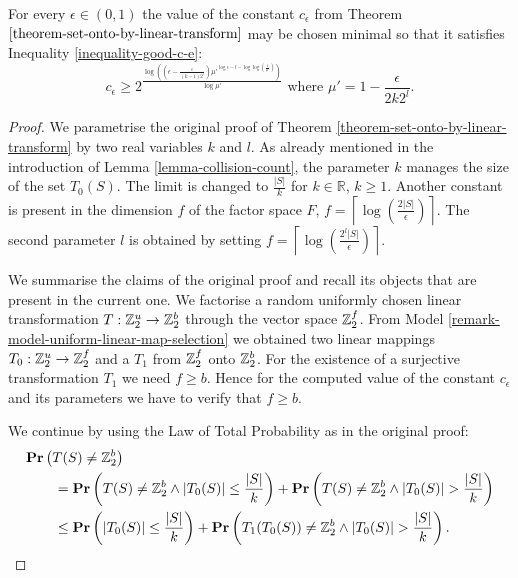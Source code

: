 \begin{statement}
\label{statement-good-c-e}
For every $\epsilon \in (0, 1)$ the value of the constant $c_\epsilon$ from Theorem $\ref{theorem-set-onto-by-linear-transform}$ may be chosen minimal so that it satisfies Inequality \ref{inequality-good-c-e}:
\begin{equation}
\label{inequality-good-c-e}
c_\epsilon \geq 2 ^ {\frac{\log \left( \left( \epsilon - \frac{\epsilon}{(k - 1) 2 ^ l}\right) {\mu'}^{\log \epsilon - l - \log \log \left(\frac{1}{\mu'}\right)}\right)}{\log \mu'}} \text{ where $\mu' = 1 - \frac{\epsilon}{2k2 ^ l}$.}
\end{equation}
\end{statement}
\begin{proof}
We parametrise the original proof of Theorem \ref{theorem-set-onto-by-linear-transform} by two real variables $k$ and $l$. As already mentioned in the introduction of Lemma \ref{lemma-collision-count}, the parameter $k$ manages the size of the set $T_0(S)$. The limit is changed to $\frac{|S|}{k}$ for $k \in \mathbb{R}$, $k \geq 1$. Another constant is present in the dimension $f$ of the factor space $F$, $f = \left\lceil \log \left(\frac{2|S|}{\epsilon}\right) \right\rceil$. The second parameter $l$ is obtained by setting $f = \left\lceil \log \left( \frac{2 ^ l |S|}{\epsilon} \right) \right\rceil$.

We summarise the claims of the original proof and recall its objects that are present in the current one. We factorise a random uniformly chosen linear transformation $T: \mathbb{Z}_{2}^{u} \rightarrow \mathbb{Z}_{2}^{b}$ through the vector space $\mathbb{Z}_{2}^{f}$. From Model \ref{remark-model-uniform-linear-map-selection} we obtained two linear mappings $T_0: \mathbb{Z}_{2}^{u} \rightarrow \mathbb{Z}_{2}^{f}$ and a $T_1$ from $\mathbb{Z}_{2}^{f}$ onto $\mathbb{Z}_{2}^{b}$. For the existence of a surjective transformation $T_1$ we need $f \geq b$. Hence for the computed value of the constant $c_\epsilon$ and its parameters we have to verify that $f \geq b$.

We continue by using the Law of Total Probability as in the original proof:
\[
\begin{split}
& \mathbf{Pr}\left(T(S) \neq \mathbb{Z}_{2}^{b}\right) \\
    & \qquad = \mathbf{Pr}\left(T(S) \neq \mathbb{Z}_{2}^{b} \wedge |T_0(S)| \leq \frac{|S|}{k}\right) + \mathbf{Pr}\left(T(S) \neq \mathbb{Z}_{2}^{b} \wedge |T_0(S)| > \frac{|S|}{k}\right) \\ 
    & \qquad \leq \mathbf{Pr}\left(|T_0(S)| \leq \frac{|S|}{k}\right) + \mathbf{Pr}\left(T_1(T_0(S)) \neq \mathbb{Z}_{2}^{b} \wedge |T_0(S)| > \frac{|S|}{k}\right) \text{.}
\end{split}
\]


\end{proof}
